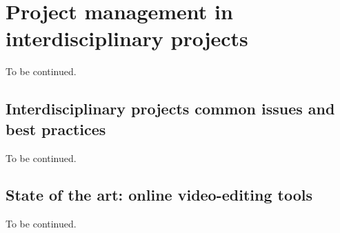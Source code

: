 \chapter{Project management in interdisciplinary projects}
\label{ch:ch2_ProjectManagement}


To be continued. 

\section{Interdisciplinary projects common issues and best practices}

To be continued. 

\section{State of the art: online video-editing tools}

To be continued. 